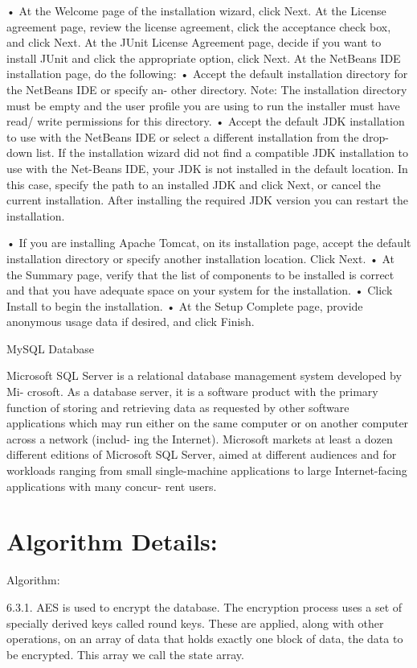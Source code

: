\documentclass[oneside,a4paper,12pt]{report}
\begin{document}
{•	At the Welcome page of the installation wizard, click Next. At the License agreement page, review the license agreement, click the acceptance check box, and click Next. At the JUnit License Agreement page, decide if you want to install JUnit and click the appropriate option, click Next. At the NetBeans IDE installation page, do the following:
•	Accept the default installation directory for the NetBeans IDE or specify an- other directory. Note: The installation directory must be empty and the user profile you are using to run the installer must have read/ write permissions for this directory.
•	Accept the default JDK installation to use with the NetBeans IDE or select   a different installation from the drop-down list. If the installation wizard did not find a compatible JDK installation to use with the Net-Beans IDE, your JDK is not installed in the default location. In this case, specify the path to an installed JDK and click Next, or cancel the current installation. After installing the required JDK version you can restart the installation.

•	If you are installing Apache Tomcat, on its installation page, accept the default installation directory or specify another installation location. Click Next.
•	At the Summary page, verify that the list of components to be installed is correct and that you have adequate space on your system for the installation.
•	Click Install to begin the installation.
•	At the Setup Complete page, provide anonymous usage data if desired, and click Finish.

MySQL Database

Microsoft SQL Server is a relational database management system developed by Mi- crosoft. As a database server, it is a software product with the primary function of storing and retrieving data as requested by other software applications which may run either on the same computer or on another computer across a network (includ- ing the Internet). Microsoft markets at least a dozen different editions of Microsoft SQL Server, aimed at different audiences and for workloads ranging from small single-machine applications to large Internet-facing applications with many concur- rent users.
\section{Algorithm Details:}
Algorithm:

6.3.1. AES is used to encrypt the database.\newline
The encryption process uses a set of specially derived keys called round keys. 
These are applied, along with other operations, on an array of data that holds exactly one block of data, the data to be encrypted. 
This array we call the state array.\newline


}
\end{document}
